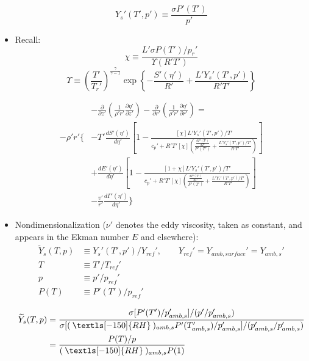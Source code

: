\documentclass[preprint, prX]{revtex4}
\newcommand{\pfrac}[2]{\left(\frac{#1}{#2}\right)}
\newcommand{\dd}[2]{\frac{d#1}{d#2}}
\newcommand{\pd}[2]{\frac{\partial#1}{\partial#2}}
\newcommand{\gogmo}{\frac{\gamma}{\gamma-1}}
\newcommand{\rh}{\:\textls[-150]{RH}\:}
\begin{document}
\begin{itemize}
\begin{equation}
Y_s'(T',p') \equiv \frac{\sigma P'(T')}{p'}
\end{equation}

\item
Recall:
\begin{equation}
\chi \equiv \frac{L'\sigma P(T')/p_r'}{\Upsilon(R' T')} 
\end{equation}
\begin{equation}
\Upsilon \equiv \pfrac{T'}{T_r'}^\gogmo \exp \left\{ -\frac{S'(\eta')}{R'} +\frac{L'Y_s'(T',p')}{R' T'} \right\}
\end{equation}

\begin{equation}
\begin{split}
&-\pd{}{z'}\left( \frac{1}{\rho' r'} \pd{\eta'}{z'}\right) - \pd{}{r'}\left(\frac{1}{\rho'r'} \pd{\eta'}{r'}\right) =\\
-\rho'r' \Bigg\{ &-T' \dd{S'(\eta')}{\eta'} \left[ 1 - \frac{[\chi] L'Y_s'(T',p')/T'}{c_p' + R'T'[\chi] \left( \frac{\dd{P'(T')}{T'}}{P'(T')} +\frac{L'Y_s'(T',p')/T'}{R'T'} \right)}\right]  \\
& + \dd{E'(\eta')}{\eta'} \left[1 - \frac{[1+\chi] L'Y_s'(T',p')/T'}{c_p' + R'T'[\chi] \left( \frac{\dd{P'(T')}{T'}}{P'(T')} +\frac{L'Y_s'(T',p')/T'}{R'T'} \right)} \right]  \\
&- \frac{v'}{r'}\dd{\Gamma'(\eta')}{\eta'} \Bigg\}
\end{split}
\end{equation}

\item
Nondimensionalization ($\nu'$ denotes the eddy viscosity, taken as constant, and appears in the Ekman number $E$ and elsewhere):
\begin{equation}
\begin{split}
\widetilde{Y}_s(T,p) &\equiv Y_s'(T',p') / Y_{ref}',  \qquad Y_{ref}' = Y_{amb,surface}' = Y_{amb,s}'\\
T &\equiv T'/T_{ref}' \\
p &\equiv p'/p_{ref}' \\
P(T) &\equiv P'(T') / p_{ref}'
\end{split}
\end{equation}

\begin{equation}
\begin{split}
\widetilde{Y}_s(T,p) &= \frac{\sigma[P'(T')/p_{amb,s}' ]/(p'/p_{amb,s}')}{\sigma[(\rh)_{amb,s} P'(T_{amb,s}')/p_{amb,s}']/(p_{amb,s}'/p_{amb,s}')} \\
&= \frac{P(T)/p}{(\rh)_{amb,s}P(1)}\\
\end{split}
\end{equation}


\end{itemize}
\end{document}
